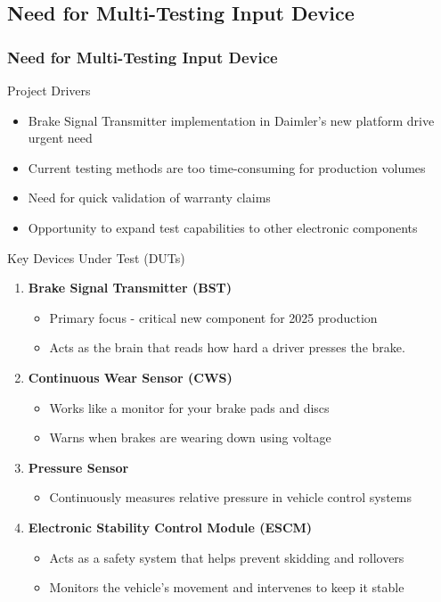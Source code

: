 \documentclass[8pt,compress]{beamer}
\newcommand\DarkBold[1]{\textcolor{VSBlueDark}{\textbf{#1}}}
\begin{document}
\subsection{Need for Multi-Testing Input Device}
\begin{frame}
    \frametitle{Need for Multi-Testing Input Device}
    \begin{block}{Project Drivers}
        \begin{itemize}
            \item Brake Signal Transmitter implementation in Daimler's new platform drive urgent need
            \item Current testing methods are too time-consuming for production volumes
            \item Need for quick validation of warranty claims
            \item Opportunity to expand test capabilities to other electronic components
        \end{itemize}
    \end{block}
    \begin{block}{Key Devices Under Test (DUTs)}
    \begin{enumerate}
        \item {\DarkBold{Brake Signal Transmitter (BST)}}
        \begin{itemize}
            \item Primary focus - critical new component for 2025 production
            \item Acts as the brain that reads how hard a driver presses the brake.
        \end{itemize}
        \item {\DarkBold{Continuous Wear Sensor (CWS)}}
        \begin{itemize}
            \item Works like a monitor for your brake pads and discs
            \item Warns when brakes are wearing down using voltage
        \end{itemize}
        \item {\DarkBold{Pressure Sensor}}
        \begin{itemize}
            \item Continuously measures relative pressure in vehicle control systems
        \end{itemize}
        \item {\DarkBold{Electronic Stability Control Module (ESCM)}}
            \begin{itemize}
                \item Acts as a safety system that helps prevent skidding and rollovers
                \item Monitors the vehicle's movement and intervenes to keep it stable
            \end{itemize}
    \end{enumerate}
  \end{block}
\end{frame}
\end{document}
